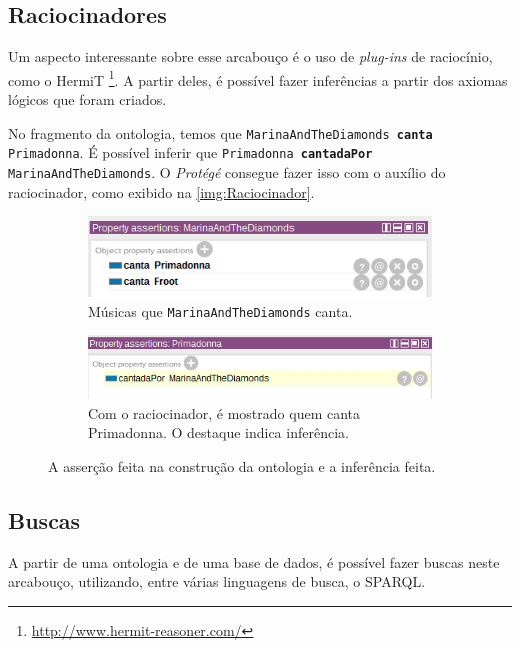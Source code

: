 \subsection{Raciocinadores}

Um aspecto interessante sobre esse arcabouço é o uso de \textit{plug-ins} de raciocínio, como o HermiT \footnote{\url{http://www.hermit-reasoner.com/}}. A partir deles, é possível fazer inferências a partir dos axiomas lógicos que foram criados.

No fragmento da ontologia, temos que \texttt{MarinaAndTheDiamonds \textbf{canta} Primadonna}. É possível inferir que \texttt{Primadonna \textbf{cantadaPor} MarinaAndTheDiamonds}. O \textit{Protégé} consegue fazer isso com o auxílio do raciocinador, como exibido na \autoref{img:Raciocinador}.

\begin{figure}
	\centering
	\begin{subfigure}{.5\textwidth}
		\centering
		\includegraphics[width=0.9\linewidth]{Capitulos/Ferramentas/marinacanta}
		\caption{Músicas que \texttt{MarinaAndTheDiamonds} canta.}
	\end{subfigure}%
	\begin{subfigure}{.5\textwidth}
		\centering
		\includegraphics[width=0.95\linewidth]{Capitulos/Ferramentas/inferencia}
		\caption{Com o raciocinador, é mostrado quem canta Primadonna. O destaque indica inferência.}
	\end{subfigure}
	\caption{A asserção feita na construção da ontologia e a inferência feita.}
	\label{img:Raciocinador}
\end{figure}

\subsection{Buscas}

A partir de uma ontologia e de uma base de dados, é possível fazer buscas neste arcabouço, utilizando, entre várias linguagens de busca, o SPARQL.

